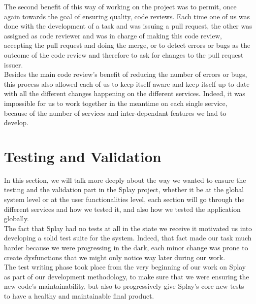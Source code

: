 \documentclass{eplmastersthesis}
\begin{document}
          The second benefit of this way of working on the project was to
          permit, once again towards the goal of ensuring quality, code
          reviews. Each time one of us was done with the development of a
          task and was issuing a pull request, the other was assigned as code
          reviewer and was in charge of making this code review, accepting the
          pull request and doing the merge, or to detect errors or bugs as the
          outcome of the code review and therefore to ask for changes to the
          pull request issuer.\\
          Besides the main code review's benefit of reducing the number of
          errors or bugs, this process also allowed each of us to keep itself
          aware and keep itself up to date with all the different changes
          happening on the different services. Indeed, it was impossible for
          us to work together in the meantime on each single service, because
          of the number of services and inter-dependant features we had to
          develop.

    \section{Testing and Validation}

      In this section, we will talk more deeply about the way we wanted to ensure
      the testing and the validation part in the Splay project, whether it be
      at the global system level or at the user functionalities level, each
      section will go through the different services and how we tested it, and
      also how we tested the application globally.\\

      The fact that Splay had no tests at all in the state we receive it
      motivated us into developing a solid test suite for the system.
      Indeed, that fact made our task much harder because we were progressing
      in the dark, each minor change was prone to create dysfunctions that we
      might only notice way later during our work.\\

      The test writing phase took place from the very beginning of our work on
      Splay as part of our development methodology,
      to make sure that we were ensuring the new code's maintainability, but
      also to progressively give Splay's core new tests to have a healthy
      and maintainable final product.
\end{document}
